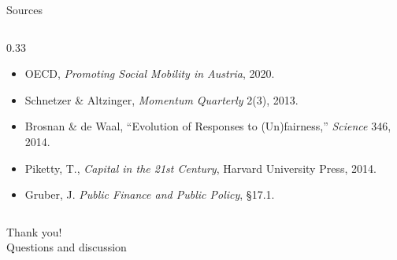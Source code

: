 \documentclass[11pt,aspectratio=169]{beamer}
\begin{document}
\begin{frame}{Sources}
\begin{columns}[T]
\begin{column}{0.33\textwidth}
\begin{itemize}
        \item OECD, \emph{Promoting Social Mobility in Austria}, 2020.
        \item Schnetzer \& Altzinger, \emph{Momentum Quarterly} 2(3), 2013.
        \item Brosnan \& de Waal, ``Evolution of Responses to (Un)fairness,'' \emph{Science} 346, 2014.
        \item Piketty, T., \emph{Capital in the 21st Century}, Harvard University Press, 2014.
        \item Gruber, J. \emph{Public Finance and Public Policy}, \S17.1.
      \end{itemize}
    \end{column}
  \end{columns}
\end{frame}

\begin{frame}[standout]
  Thank you!\\
  \vspace{0.5em}
  \small Questions and discussion
\end{frame}
\end{document}
